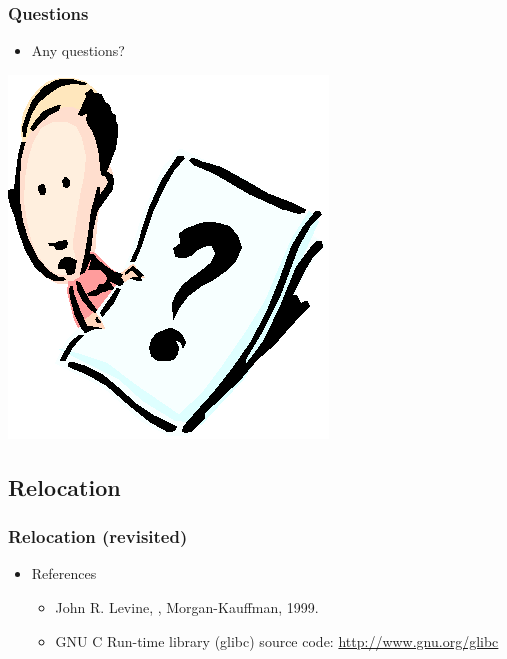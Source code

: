 \documentclass[CJKutf8,xcolor=pdftex,dvipsnames,table]{beamer}
\begin{document}
\begin{CJK*}{UTF8}{song}
  \begin{frame}
    \frametitle{Questions}
    \begin{itemize}
    \item{Any questions?}
    \end{itemize}
    \begin{center}
      \includegraphics[scale=.5]{question}
    \end{center}
  \end{frame}
  
  \subsection{Relocation}

  \begin{frame}
    \frametitle{Relocation (revisited)} \pause
    \begin{itemize}
    \item{References} \pause
      \begin{itemize}
      \item{John R. Levine, , Morgan-Kauffman, 1999.} \pause
      \item{GNU C Run-time library (glibc) source code: \url{http://www.gnu.org/glibc}}
      \end{itemize}
    \end{itemize}
  \end{frame}
  

\end{CJK*}
\end{document}
